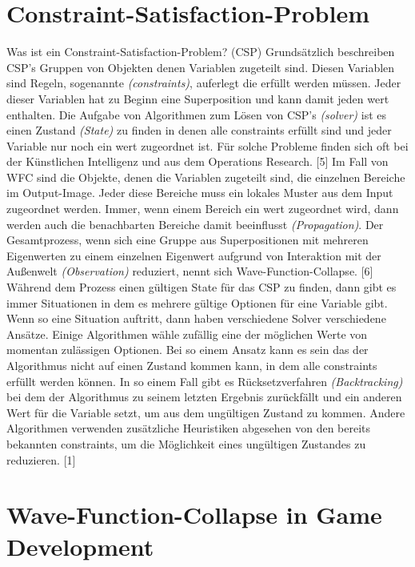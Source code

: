 \documentclass[12pt]{report}
\begin{document}
\section{Constraint-Satisfaction-Problem}

Was ist ein Constraint-Satisfaction-Problem? {(CSP)}
Grundsätzlich beschreiben CSP's Gruppen von Objekten denen Variablen zugeteilt sind.
Diesen Variablen sind Regeln, sogenannte \textit{(constraints)}, auferlegt die erfüllt werden müssen.
Jeder dieser Variablen hat zu Beginn eine Superposition und kann damit jeden wert enthalten.
Die Aufgabe von Algorithmen zum Lösen von CSP's \textit{(solver)} ist es einen Zustand \textit{(State)} zu finden in denen alle constraints erfüllt sind und jeder Variable nur noch ein wert zugeordnet ist.
Für solche Probleme finden sich oft bei der Künstlichen Intelligenz und aus dem Operations Research. {[5]}
Im Fall von WFC sind die Objekte, denen die Variablen zugeteilt sind, die einzelnen Bereiche im Output-Image.
Jeder diese Bereiche muss ein lokales Muster aus dem Input zugeordnet werden.
Immer, wenn einem Bereich ein wert zugeordnet wird, dann werden auch die benachbarten Bereiche damit beeinflusst \textit{(Propagation)}.
Der Gesamtprozess, wenn sich eine Gruppe aus Superpositionen mit mehreren Eigenwerten zu einem einzelnen Eigenwert aufgrund von Interaktion mit der Außenwelt \textit{(Observation)} reduziert,
nennt sich Wave-Function-Collapse. {[6]}
Während dem Prozess einen gültigen State für das CSP zu finden, dann gibt es immer Situationen in dem es mehrere gültige Optionen für eine Variable gibt.
Wenn so eine Situation auftritt, dann haben verschiedene Solver verschiedene Ansätze.
Einige Algorithmen wähle zufällig eine der möglichen Werte von momentan zulässigen Optionen.
Bei so einem Ansatz kann es sein das der Algorithmus nicht auf einen Zustand kommen kann, in dem alle constraints erfüllt werden können.
In so einem Fall gibt es Rücksetzverfahren \textit{(Backtracking)} bei dem der Algorithmus zu seinem letzten Ergebnis zurückfällt und ein anderen Wert für die Variable setzt, um aus dem
ungültigen Zustand zu kommen.
Andere Algorithmen verwenden zusätzliche Heuristiken abgesehen von den bereits bekannten constraints, um die Möglichkeit eines ungültigen Zustandes zu reduzieren. {[1]} 

\section{Wave-Function-Collapse in Game Development}
\end{document}

